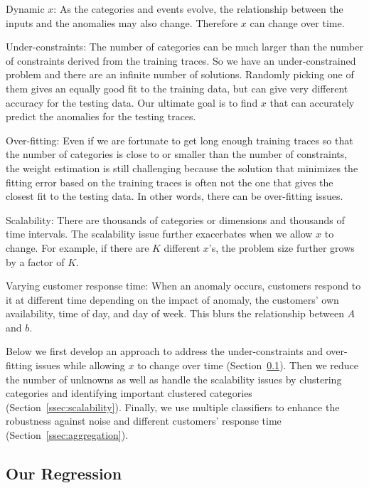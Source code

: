 \begin{senumerate}
  \item Dynamic $x$: As the categories and events evolve, the
    relationship between the inputs and the anomalies may also
    change. Therefore $x$ can change over time. 
  \item Under-constraints: The number of categories can be much larger
    than the number of constraints derived from the training traces.
    So we have an under-constrained problem and there are an infinite
    number of solutions. Randomly picking one of them gives an equally
    good fit to the training data, but can give very
    different accuracy for the testing data. Our ultimate
    goal is to find $x$ that can accurately predict the
    anomalies for the testing traces.
  \item Over-fitting: Even if we are fortunate to get long enough
    training traces so that the number of categories is close to or
    smaller than the number of constraints, the weight estimation is
    still challenging because the solution that minimizes the fitting
    error based on the training traces is often not the one that gives
    the closest fit to the testing data. In other words, there can be
    over-fitting issues.
  \item Scalability: There are thousands of categories or dimensions
    and thousands of time intervals. The scalability issue further exacerbates
    when we allow $x$ to change. For example, if there are
    $K$ different $x$'s, the problem size further grows by a factor of $K$.
  \item Varying customer response time: When an anomaly
     occurs, customers respond to it at different time depending on
     the impact of anomaly, the customers' own availability, time of
     day, and day of week. This
     blurs the relationship between $A$ and $b$.
\end{senumerate}    

Below we first develop an approach to address the under-constraints
and over-fitting issues while allowing $x$ to change over time
(Section~\ref{ssec:regression}). Then we reduce the number of unknowns
as well as handle the scalability issues by clustering categories and
identifying important clustered categories (Section~\ref{ssec:scalability}). 
Finally, we use multiple classifiers to enhance the
robustness against noise and different customers' response time (Section~\ref{ssec:aggregation}).


\subsection{Our Regression}
\label{ssec:regression}

